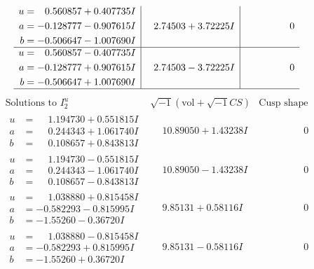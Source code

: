 \documentclass[1p]{elsarticle_modified}
\theoremstyle{definition}
\newcommand{\I}{\sqrt{-1}}
\begin{document}
$$\begin{array}{c|c|c}
\begin{aligned}
u &= \phantom{-}0.560857 + 0.407735 I \\
a &= -0.128777 - 0.907615 I \\
b &= -0.506647 - 1.007690 I\end{aligned}
 & \phantom{-}2.74503 + 3.72225 I & \phantom{-0.000000 } 0 \\ \hline\begin{aligned}
u &= \phantom{-}0.560857 - 0.407735 I \\
a &= -0.128777 + 0.907615 I \\
b &= -0.506647 + 1.007690 I\end{aligned}
 & \phantom{-}2.74503 - 3.72225 I & \phantom{-0.000000 } 0\\
 \hline 
 \end{array}$$\newpage$$\begin{array}{c|c|c}  
\text{Solutions to }I^u_{2}& \I (\text{vol} + \sqrt{-1}CS) & \text{Cusp shape}\\
 \hline 
\begin{aligned}
u &= \phantom{-}1.194730 + 0.551815 I \\
a &= \phantom{-}0.244343 + 1.061740 I \\
b &= \phantom{-}0.108657 + 0.843813 I\end{aligned}
 & \phantom{-}10.89050 + 1.43238 I & \phantom{-0.000000 } 0 \\ \hline\begin{aligned}
u &= \phantom{-}1.194730 - 0.551815 I \\
a &= \phantom{-}0.244343 - 1.061740 I \\
b &= \phantom{-}0.108657 - 0.843813 I\end{aligned}
 & \phantom{-}10.89050 - 1.43238 I & \phantom{-0.000000 } 0 \\ \hline\begin{aligned}
u &= \phantom{-}1.038880 + 0.815458 I \\
a &= -0.582293 - 0.815995 I \\
b &= -1.55260 - 0.36720 I\end{aligned}
 & \phantom{-}9.85131 + 0.58116 I & \phantom{-0.000000 } 0 \\ \hline\begin{aligned}
u &= \phantom{-}1.038880 - 0.815458 I \\
a &= -0.582293 + 0.815995 I \\
b &= -1.55260 + 0.36720 I\end{aligned}
 & \phantom{-}9.85131 - 0.58116 I & \phantom{-0.000000 } 0 \\ \hline\begin{aligned}

\end{aligned}
\end{array}$$
\end{document}
